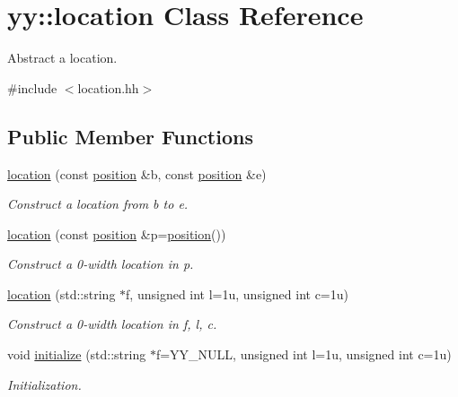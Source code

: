 \hypertarget{classyy_1_1location}{\section{yy\-:\-:location Class Reference}
\label{classyy_1_1location}
}


Abstract a location.  




{\ttfamily \#include $<$location.\-hh$>$}

\subsection*{Public Member Functions}
\begin{DoxyCompactItemize}
\item 
\hypertarget{classyy_1_1location_a0d659c37bcd57075c7bb25e600d3f526}{\hyperlink{classyy_1_1location_a0d659c37bcd57075c7bb25e600d3f526}{location} (const \hyperlink{classyy_1_1position}{position} \&b, const \hyperlink{classyy_1_1position}{position} \&e)}\label{classyy_1_1location_a0d659c37bcd57075c7bb25e600d3f526}

\begin{DoxyCompactList}\small\item\em Construct a location from {\itshape b} to {\itshape e}. \end{DoxyCompactList}\item 
\hypertarget{classyy_1_1location_a378c53e8dc67416748f0b12844919e51}{\hyperlink{classyy_1_1location_a378c53e8dc67416748f0b12844919e51}{location} (const \hyperlink{classyy_1_1position}{position} \&p=\hyperlink{classyy_1_1position}{position}())}\label{classyy_1_1location_a378c53e8dc67416748f0b12844919e51}

\begin{DoxyCompactList}\small\item\em Construct a 0-\/width location in {\itshape p}. \end{DoxyCompactList}\item 
\hypertarget{classyy_1_1location_a75594362f84338b764164cd632ee7d9e}{\hyperlink{classyy_1_1location_a75594362f84338b764164cd632ee7d9e}{location} (std\-::string $\ast$f, unsigned int l=1u, unsigned int c=1u)}\label{classyy_1_1location_a75594362f84338b764164cd632ee7d9e}

\begin{DoxyCompactList}\small\item\em Construct a 0-\/width location in {\itshape f}, {\itshape l}, {\itshape c}. \end{DoxyCompactList}\item 
\hypertarget{classyy_1_1location_a0f7f01fcb693c6ea82f4b087d77fdb38}{void \hyperlink{classyy_1_1location_a0f7f01fcb693c6ea82f4b087d77fdb38}{initialize} (std\-::string $\ast$f=Y\-Y\-\_\-\-N\-U\-L\-L, unsigned int l=1u, unsigned int c=1u)}\label{classyy_1_1location_a0f7f01fcb693c6ea82f4b087d77fdb38}

\begin{DoxyCompactList}\small\item\em Initialization. \end{DoxyCompactList}\end{DoxyCompactItemize}
